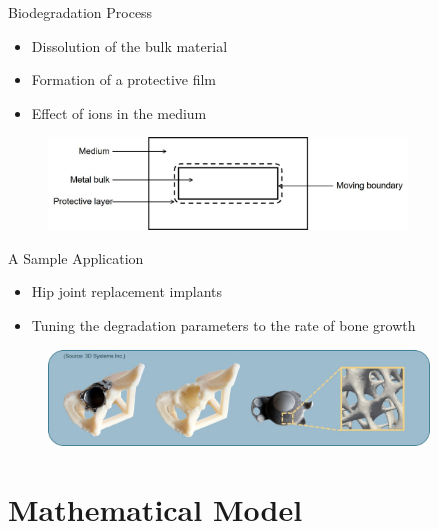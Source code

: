 \documentclass[11pt,t]{beamer}
\begin{document}
\begin{frame}[fragile]{Biodegradation Process}  

\begin{itemize}
\item
Dissolution of the bulk material 
\item
Formation of a protective film
\item
 Effect of ions in the medium
\end{itemize}

	\begin{figure}
			\centering
			\includegraphics[width=0.85\textwidth]{schematic}
			 
	\end{figure}

\end{frame}


\begin{frame}[fragile]{A Sample Application}  

\begin{itemize}
\item
Hip joint replacement implants
\item
Tuning the degradation parameters to the rate of bone growth
\end{itemize}

\vspace{0.5cm}
	\begin{figure}
			\centering
			\includegraphics[width=0.9\textwidth]{hip_implant}
			 
	\end{figure}

\end{frame}


\section{Mathematical Model}
\end{document}
